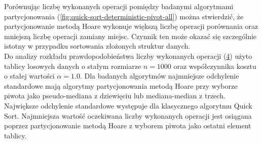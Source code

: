 Porównując liczbę wykonanych operacji pomiędzy badanymi algorytmami partycjonowania (\ref{fig:quick-sort-deterministic-pivot-all}) można stwierdzić, że partycjonowanie metodą Hoare wykonuje większą liczbę operacji porównania oraz mniejszą liczbę operacji zamiany miejsc. Czynnik ten może okazać się szczególnie istotny w przypadku sortowania złożonych struktur danych.\\

Do analizy rozkładu prawdopodobieństwa liczby wykonanych operacji (\ref{fig:quick-sort-deterministic-pivot-density}) użyto tablicy losowych danych o stałym rozmiarze $n = 1000$ oraz współczynnika kosztu o stałej wartości $\alpha = 1.0$. Dla badanych algorytmów najmniejsze odchylenie standardowe mają algorytmy partycjonowania metodą Hoare przy wyborze piwota jako pseudo-mediana z dziewięciu lub mediana-median z trzech. Największe odchylenie standardowe występuje dla klasycznego algorytmu Quick Sort. Najmniejsza wartość oczekiwana liczby wykonanych operacji jest osiągana poprzez partycjonowanie metodą Hoare z wyborem piwota jako ostatni element tablicy.


\begin{figure}[]
	\centering
	
	\caption[]{}
	\label{fig:quick-sort-deterministic-pivot-random}
\end{figure}

\begin{figure}[]
	\centering
	
	\caption[]{}
	\label{fig:quick-sort-deterministic-pivot-reversed}
\end{figure}

\begin{figure}[]
	\centering
	
	\caption[]{}
	\label{fig:quick-sort-deterministic-pivot-cost-factor}
\end{figure}

\begin{figure}[]
	\centering
	
	\caption[]{}
	\label{fig:quick-sort-deterministic-pivot-density}
\end{figure}

